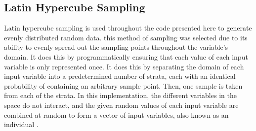 \subsection{Latin Hypercube Sampling}
\label{sec:lhs}

Latin hypercube sampling is used throughout the code presented here to generate evenly distributed random data. this method of sampling was selected due to its ability to evenly spread out the sampling points throughout the variable's domain. It does this by programmatically ensuring that each value of each input variable is only represented once. It does this by separating the domain of each input variable into a predetermined number of strata, each with an identical probability of containing an arbitrary sample point. Then, one sample is taken from each of the strata. In this implementation, the different variables in the space do not interact, and the given random values of each input variable are combined at random to form a vector of input variables, also known as an individual \cite{lhs}.  
